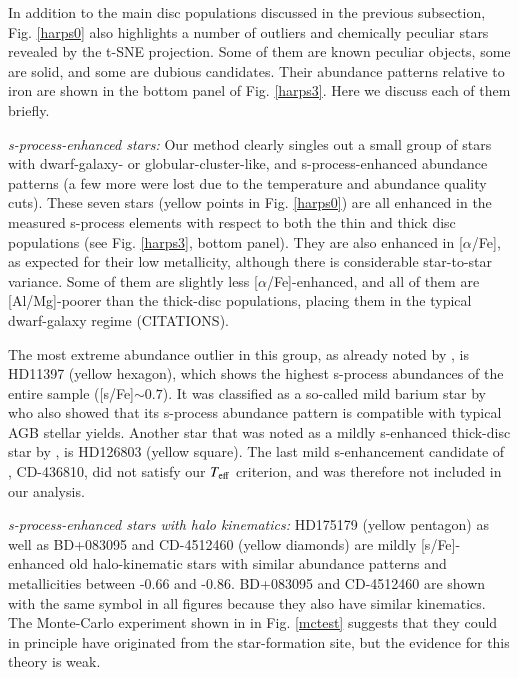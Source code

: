 \documentclass{aa}  %
\begin{document}
In addition to the main disc populations discussed in the previous subsection, Fig. \ref{harps0} also highlights a number of outliers and chemically peculiar stars revealed by the t-SNE projection. Some of them are known peculiar objects, some are solid, and some are dubious candidates. Their abundance patterns relative to iron are shown in the bottom panel of Fig. \ref{harps3}. Here we discuss each of them briefly.

{\it s-process-enhanced stars:} Our method clearly singles out a small group of stars with dwarf-galaxy- or globular-cluster-like, and s-process-enhanced abundance patterns (a few more were lost due to the temperature and abundance quality cuts). These seven stars (yellow points in Fig. \ref{harps0}) are all enhanced in the measured s-process elements with respect to both the thin and thick disc populations (see Fig. \ref{harps3}, bottom panel). They are also enhanced in [$\alpha$/Fe], as expected for their low metallicity, although there is considerable star-to-star variance. Some of them are slightly less [$\alpha$/Fe]-enhanced, and all of them are [Al/Mg]-poorer than the thick-disc populations, placing them in the typical dwarf-galaxy regime (CITATIONS). 

The most extreme abundance outlier in this group, as already noted by \citet{DelgadoMena2017}, is HD11397 (yellow hexagon), which shows the highest s-process abundances of the entire sample ([s/Fe]$\sim0.7$). It was classified as a so-called mild barium star by \citet{Pompeia2008} who also showed that its s-process abundance pattern is compatible with typical AGB stellar yields. 
Another star that was noted as a mildly s-enhanced thick-disc star by \citet{DelgadoMena2017}, is HD126803 (yellow square). The last mild s-enhancement candidate of \citet{DelgadoMena2017}, CD-436810, did not satisfy our $T_{\rm eff}$ criterion, and was therefore not included in our analysis. 

{\it s-process-enhanced stars with halo kinematics:} HD175179 (yellow pentagon) as well as BD+083095 and CD-4512460 (yellow diamonds) are mildly [s/Fe]-enhanced old halo-kinematic stars with similar abundance patterns and metallicities between -0.66 and -0.86. BD+083095 and CD-4512460 are shown with the same symbol in all figures because they also have similar kinematics. The Monte-Carlo experiment shown in in Fig. \ref{mctest} suggests that they could in principle have originated from the star-formation site, but the evidence for this theory is weak.
\end{document}
